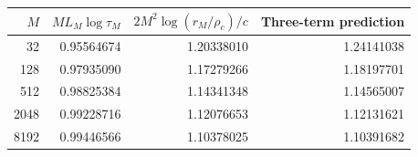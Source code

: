 \begin{tabular}{rrrr}
\toprule
$M$ & $M L_M\log\tau_M$ & $2M^2\log(r_M/\rho_c)/c$ & Three-term prediction \\
\midrule
32 & 0.95564674 & 1.20338010 & 1.24141038 \\
128 & 0.97935090 & 1.17279266 & 1.18197701 \\
512 & 0.98825384 & 1.14341348 & 1.14565007 \\
2048 & 0.99228716 & 1.12076653 & 1.12131621 \\
8192 & 0.99446566 & 1.10378025 & 1.10391682 \\
\bottomrule
\end{tabular}

